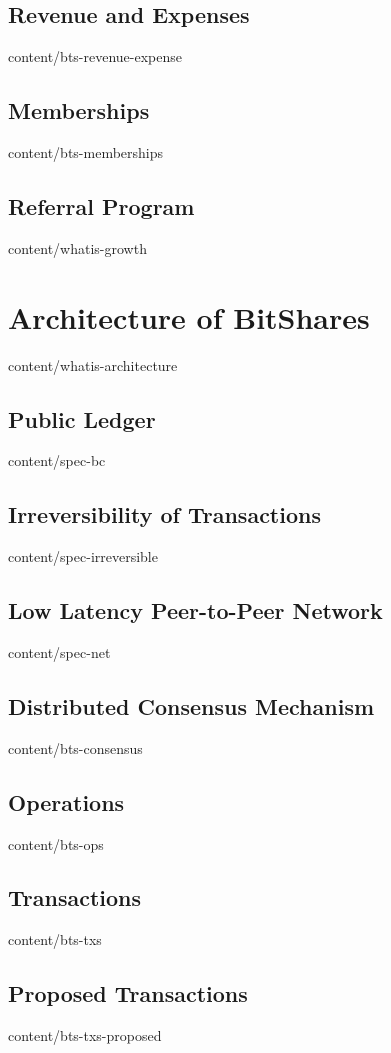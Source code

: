 \documentclass[unpublished]{btswhitepaper}
\begin{document}
\subsection    { Revenue and Expenses              }  { content/bts-revenue-expense }
\subsection    { Memberships                       }  { content/bts-memberships     }
\subsection    { Referral Program                  }  { content/whatis-growth       } 

\section       { Architecture of BitShares         }  { content/whatis-architecture } 
\subsection    { Public Ledger                     }  { content/spec-bc             } 
\subsection    { Irreversibility of Transactions   }  { content/spec-irreversible   }
\subsection    { Low Latency Peer-to-Peer Network  }  { content/spec-net            } 
\subsection    { Distributed Consensus Mechanism   }  { content/bts-consensus       } 
\subsection    { Operations                        }  { content/bts-ops             } 
\subsection    { Transactions                      }  { content/bts-txs             } 
\subsection    { Proposed Transactions             }  { content/bts-txs-proposed    }
\end{document}
